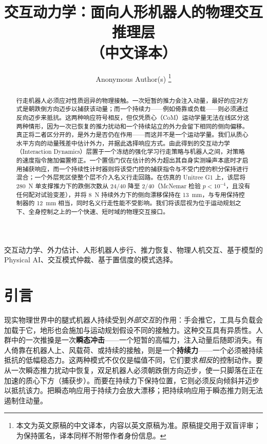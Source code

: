 \documentclass[journal]{IEEEtran}
\begin{document}
\title{交互动力学：面向人形机器人的物理交互推理层\\[2pt]\large（中文译本）}

\author{Anonymous Author(s)%
\thanks{本文为英文原稿的中文译本，内容以英文原稿为准。原稿提交用于双盲评审；为保持匿名，译本同样不附带作者身份信息。}%
}


\maketitle

\begin{abstract}
行走机器人必须应对性质迥异的物理接触。一次短暂的推力会注入动量，最好的应对方式是朝跌倒方向迈步以捕获该动量；而一个持续力——例如倚靠或负载——则必须通过反向迈步来抵抗。这两种响应符号相反，但仅凭质心（CoM）运动学量无法在线区分这两种情形，因为一次已恢复的推力扰动和一个持续站立的外力会留下相同的侧向偏移。真正将二者区分开的，是外力是否仍在作用——而这并不是一个运动学量。我们从质心水平方向的动量残差中估计外力，并据此选择响应方式。由此得到的交互动力学（Interaction Dynamics）层置于一个冻结的强化学习行走策略与机器人之间，对策略的速度指令施加偏置修正。一个置信门仅在估计的外力超出其自身实测噪声本底时才启用捕获响应，而一个持续性计时器则将该受门控的捕获指令与不受门控的积分保持进行混合；一个外层死区使整个层不介入名义行走回路。在仿真的 Unitree G1 上，该层将 280~N 单支撑推力下的跌倒次数从 24/40 降至 2/40（McNemar 检验 $p<10^{-4}$，且没有任何配对试验变差），并将 8~N 持续外力下的侧向漂移保持在 13~mm，与专用保持控制器的 12~mm 相当，同时名义行走性能不受影响。我们将该层视为位于运动规划之下、全身控制之上的一个快速、短时域的物理交互接口。
\end{abstract}

\begin{IEEEkeywords}
交互动力学、外力估计、人形机器人步行、推力恢复、物理人机交互、基于模型的 Physical AI、交互模式仲裁、基于置信度的模式选择。
\end{IEEEkeywords}

\section{引言}
\label{sec:intro}

现实物理世界中的腿式机器人持续受到\emph{外部交互}的作用：手会推它，工具与负载会加载于它，地形也会施加与运动规划假设不同的接触力。这种交互具有异质性。人群中的一次推搡是一次\textbf{瞬态冲击}——一个短暂的高幅力，注入动量后随即消失。有人倚靠在机器人上、风载荷、或持续的接触，则是一个\textbf{持续力}——一个必须被持续抵抗的低幅稳态力。这两种模式不仅仅是幅值不同，它们要求\emph{相反}的控制动作。要从一次瞬态推力扰动中恢复，双足机器人必须朝跌倒方向迈步，使一只脚落在正在加速的质心下方（捕获步）。而要在持续力下保持位置，它则必须反向倾斜并迈步以抵抗该力。把瞬态响应用于持续力会放大漂移；把持续响应用于瞬态推力则无法遏制住动量。
\end{document}
